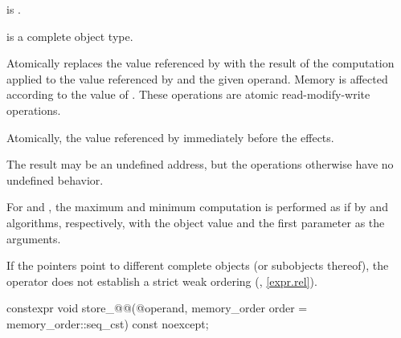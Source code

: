 \begin{itemdescr}
\pnum
\constraints
{} is .

\pnum
\mandates
{} is a complete object type.

\pnum
\effects
Atomically replaces the value referenced by  with
the result of the computation applied to the value referenced by 
and the given operand.
Memory is affected according to the value of .
These operations are atomic read-modify-write operations.

\pnum
\returns
Atomically, the value referenced by 
immediately before the effects.

\pnum
\remarks
The result may be an undefined address,
but the operations otherwise have no undefined behavior.

\pnum
For  and , the maximum and minimum
computation is performed as if by  and 
algorithms, respectively, with the object value and the first
parameter as the arguments.

\begin{note}
If the pointers point to different complete objects (or subobjects thereof),
the \tcode{<} operator does not establish a strict weak ordering
(, \ref{expr.rel}).
\end{note}
\end{itemdescr}

%
%
%
%
\begin{itemdecl}
constexpr void store_@@(@\seeabovenc@ operand,
                         memory_order order = memory_order::seq_cst) const noexcept;
\end{itemdecl}


